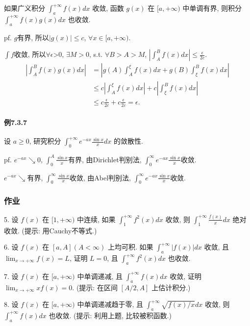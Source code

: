 如果广义积分 $\int_{a}^{+\infty}f(x)dx$ 收敛, 函数 $g(x)$ 在 $[a,+\infty)$
中单调有界, 则积分 $\int_{a}^{+\infty}f(x)g(x)dx$ 也收敛.

pf. $g$有界, 所以$\left|g(x)\right|\le c$, $\forall x\in[a,+\infty)$.

$\int f$收敛, 所以$\forall\epsilon$>0, $\exists M>0$, s.t. $\forall B>A>M$,
$\left|\int_{A}^{B}f(x)dx\right|\le\frac{\epsilon}{2c}$. 
\[
\begin{aligned}\left|\int_{A}^{B}f(x)g(x)dx\right| & =\left|g(A)\int_{A}^{\xi}f(x)dx+g(B)\int_{\xi}^{B}f(x)dx\right|\\
 & \leqslant c\left|\int_{A}^{\xi}f(x)dx\right|+c\left|\int_{\xi}^{B}f(x)dx\right|\\
 & \leqslant c\frac{\epsilon}{2c}+c\frac{\epsilon}{2c}=\epsilon.
\end{aligned}
\]


\paragraph{例7.3.7}

设 $a\geqslant0$, 研究积分 $\int_{0}^{+\infty}e^{-ax}\frac{\sin x}{x}dx$
的敛散性.

pf. $e^{-ax}\searrow0$, $\int_{0}^{A}\frac{\sin x}{x}$有界, 由Dirichlet判别法,
$\int_{0}^{\infty}e^{-ax}\frac{\sin x}{x}$收敛.

$e^{-ax}\searrow$有界, $\int_{0}^{\infty}\frac{\sin x}{x}$收敛, 由Abel判别法,
$\int_{0}^{\infty}e^{-ax}\frac{\sin x}{x}$收敛.

\subsubsection{作业}

5. 设 $f(x)$ 在 $[1,+\infty)$ 中连续, 如果 $\int_{1}^{+\infty}f^{2}(x)dx$
收敛, 则 $\int_{1}^{+\infty}\frac{f(x)}{x}dx$ 绝对收敛. (提示: 用Cauchy不等式.)

6. 设 $f(x)$ 在 $[a,A](A<\infty)$ 上均可积. 如果 $\int_{a}^{+\infty}|f(x)|dx$
收敛, 且 $\lim_{x\rightarrow+\infty}f(x)=L$, 证明 $L=0$, 且 $\int_{a}^{+\infty}f^{2}(x)dx$
也收敛.

7. 设 $f(x)$ 在 $[a,+\infty)$ 中单调递减, 且 $\int_{a}^{+\infty}f(x)dx$
收敛, 证明 $\lim_{x\rightarrow+\infty}xf(x)=0$. (提示: 在区间 $[A/2,A]$ 上估计积分.)

8. 设 $f(x)$ 在 $[a,+\infty)$ 中单调递减趋于零, 且 $\int_{a}^{+\infty}\sqrt{f(x)/x}dx$
收敛, 则 $\int_{a}^{+\infty}f(x)dx$ 也收敛. (提示: 利用上题, 比较被积函数.)

